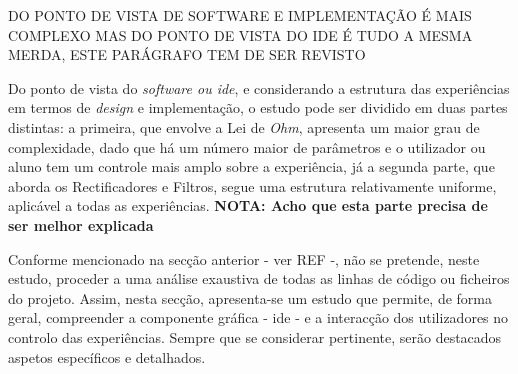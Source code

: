 






DO PONTO DE VISTA DE SOFTWARE E IMPLEMENTAÇÃO É MAIS COMPLEXO MAS DO PONTO DE VISTA DO IDE É TUDO A MESMA MERDA, ESTE PARÁGRAFO TEM DE SER REVISTO

Do ponto de vista do \textit{software ou \acrshort{ide}}, e considerando a estrutura das experiências em termos de \textit{design} e implementação, o estudo pode ser dividido em duas partes distintas: a primeira, que envolve a Lei de \textit{Ohm}, apresenta um maior grau de complexidade, dado que há um número maior de parâmetros e o utilizador ou aluno tem um controle mais amplo sobre a experiência, já a segunda parte, que aborda os Rectificadores e Filtros, segue uma estrutura relativamente uniforme, aplicável a todas as experiências. \textbf{NOTA: Acho que esta parte precisa de ser melhor explicada}

Conforme mencionado na secção anterior - ver REF -, não se pretende, neste estudo, proceder a uma análise exaustiva de todas as linhas de código ou ficheiros do projeto. Assim, nesta secção, apresenta-se um estudo que permite, de forma geral, compreender a componente gráfica - \acrshort{ide} - e a interacção dos utilizadores no controlo das experiências. Sempre que se considerar pertinente, serão destacados aspetos específicos e detalhados.

